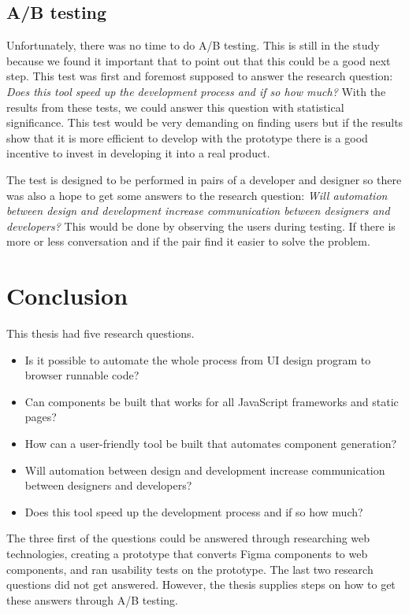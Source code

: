 \subsection{A/B testing}%
\label{sub:A/B testing}
Unfortunately, there was no time to do A/B testing. This is still in the study because we found it important that to point out that this could be a good next step. This test was first and foremost supposed to answer the  research question: \textit{Does this tool speed up the development process and if so how much?} With the results from these tests, we could answer this question with statistical significance. This test would be very demanding on finding users but if the results show that it is more efficient to develop with the prototype there is a good incentive to invest in developing it into a real product. 

The test is designed to be performed in pairs of a developer and designer so there was also a hope to get some answers to the research question: \textit{Will automation between design and development increase communication between designers and developers?} This would be done by observing the users during testing. If there is more or less conversation and if the pair find it easier to solve the problem.

\newpage
\section{Conclusion}
\label{sub:conclusion}
This thesis had five research questions.  
\begin{itemize}
  \item Is it possible to automate the whole process from UI design program to browser runnable code? 
 \item Can components be built that works for all JavaScript frameworks and static pages?
  \item How can a user-friendly tool be built that automates component generation?  
  \item Will automation between design and development increase communication between designers and developers?
  \item Does this tool speed up the development process and if so how much?
\end{itemize}

The three first of the questions could be answered through researching web technologies, creating a prototype that converts Figma components to web components, and ran usability tests on the prototype. The last two research questions did not get answered. However, the thesis supplies steps on how to get these answers through A/B testing.

